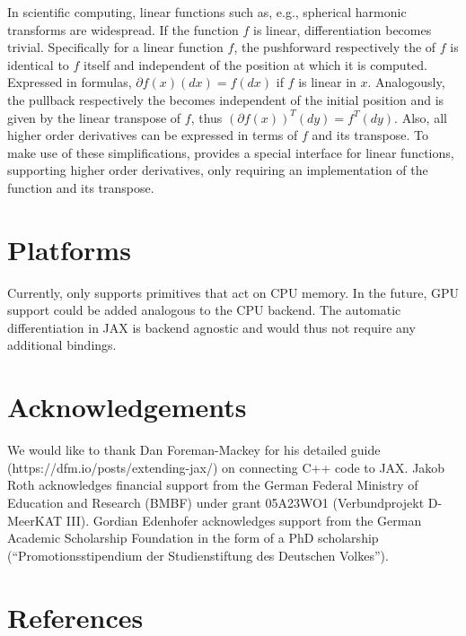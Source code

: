 \documentclass[10pt,a4paper,onecolumn]{article}
\let\textttOrig=\texttt
\def\texttt#1{\expandafter\textttOrig{\seqsplit{#1}}}
\begin{document}
In scientific computing, linear functions such as, e.g., spherical
harmonic transforms are widespread. If the function \(f\) is linear,
differentiation becomes trivial. Specifically for a linear function
\(f\), the pushforward respectively the \texttt{jvp} of \(f\) is
identical to \(f\) itself and independent of the position at which it is
computed. Expressed in formulas, \(\partial f(x)(dx) = f(dx)\) if \(f\)
is linear in \(x\). Analogously, the pullback respectively the
\texttt{vjp} becomes independent of the initial position and is given by
the linear transpose of \(f\), thus
\((\partial f(x))^{T}(dy) = f^T(dy)\). Also, all higher order
derivatives can be expressed in terms of \(f\) and its transpose. To
make use of these simplifications, \texttt{JAXbind} provides a special
interface for linear functions, supporting higher order derivatives,
only requiring an implementation of the function and its transpose.

\hypertarget{platforms}{%
\section{Platforms}\label{platforms}}

Currently, \texttt{JAXbind} only supports primitives that act on CPU memory.
In the future, GPU support could be added analogous to the CPU backend.
The automatic differentiation in JAX is backend agnostic and would thus not require any additional bindings.

\hypertarget{acknowledgements}{%
\section{Acknowledgements}\label{acknowledgements}}

We would like to thank Dan Foreman-Mackey for his detailed guide
(https://dfm.io/posts/extending-jax/) on connecting C++ code to JAX.
Jakob Roth acknowledges financial support from the German Federal
Ministry of Education and Research (BMBF) under grant 05A23WO1
(Verbundprojekt D-MeerKAT III). Gordian Edenhofer acknowledges support
from the German Academic Scholarship Foundation in the form of a PhD
scholarship (``Promotionsstipendium der Studienstiftung des Deutschen
Volkes'').

\hypertarget{references}{%
\section{References}\label{references}}
\end{document}
